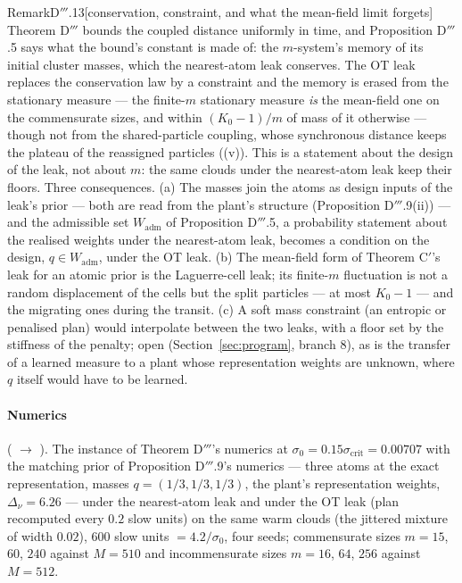 \begin{rmk}{Remark}{D$'''$.13}[conservation, constraint, and what the mean-field limit forgets]
Theorem D$'''$ bounds the coupled distance uniformly in time, and Proposition D$'''$.5 says what the bound's constant
is made of: the $m$-system's memory of its initial cluster masses, which the nearest-atom leak conserves. The OT
leak replaces the conservation law by a constraint and the memory is erased from the stationary measure --- the
finite-$m$ stationary measure \emph{is} the mean-field one on the commensurate sizes, and within $(K_0 - 1)/m$ of
mass of it otherwise --- though not from the shared-particle coupling, whose synchronous distance keeps the plateau
of the reassigned particles ((v)). This is a statement about the design of the leak, not about $m$: the same clouds
under the nearest-atom leak keep their floors. Three consequences. (a) The masses join the atoms as design inputs of
the leak's prior --- both are read from the plant's structure (Proposition D$'''$.9(ii)) --- and the admissible set
$W_{\mathrm{adm}}$ of Proposition D$'''$.5, a probability statement about the realised weights under the
nearest-atom leak, becomes a condition on the design, $q\in W_{\mathrm{adm}}$, under the OT leak. (b) The
mean-field form of Theorem C$'$'s leak for an atomic prior is the Laguerre-cell leak; its finite-$m$ fluctuation is
not a random displacement of the cells but the split particles --- at most $K_0 - 1$ --- and the migrating ones
during the transit. (c) A soft mass constraint (an entropic or penalised plan) would interpolate between the two
leaks, with a floor set by the stiffness of the penalty; open (Section~\ref{sec:program}, branch 8), as is the
transfer of a learned measure to a plant whose representation weights are unknown, where $q$ itself would have to
be learned.
\end{rmk}

\paragraph{Numerics} ( $\to$ ). The instance of Theorem
D$'''$'s numerics at $\sigma_0 = 0.15\sigma_{\mathrm{crit}} = 0.00707$ with the matching prior of Proposition
D$'''$.9's numerics --- three atoms at the exact representation, masses $q = (1/3,1/3,1/3)$, the plant's
representation weights, $\Delta_\nu = 6.26$ --- under the nearest-atom leak and under the OT leak (plan recomputed
every $0.2$ slow units) on the same warm clouds (the jittered mixture of width $0.02$), 600 slow units
${}= 4.2/\sigma_0$, four seeds; commensurate sizes $m = 15$, $60$, $240$ against $M = 510$ and incommensurate sizes
$m = 16$, $64$, $256$ against $M = 512$.

